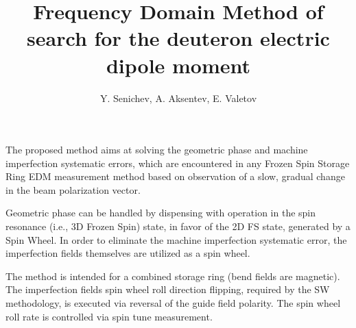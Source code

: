 \documentclass{article}
\begin{document}
\title{Frequency Domain Method of search for the deuteron electric dipole moment}
\author{Y. Senichev, A. Aksentev, E. Valetov}
\date{\nodate}
\maketitle


The proposed method aims at solving the geometric phase and machine imperfection systematic errors, which are
encountered in any Frozen Spin Storage Ring EDM measurement method based on observation of a slow, gradual
change in the beam polarization vector.

Geometric phase can be handled by dispensing with operation in the spin resonance (i.e., 3D Frozen Spin) state,
in favor of the 2D FS state, generated by a Spin Wheel. In order to eliminate the machine imperfection
systematic error, the imperfection fields themselves are utilized as a spin wheel.

The method is intended for a combined storage ring (bend fields are magnetic).
The imperfection fields spin wheel roll direction flipping, required by the SW methodology,
is executed via reversal of the guide field polarity. The spin wheel roll rate is controlled
via spin tune measurement.
\end{document}

